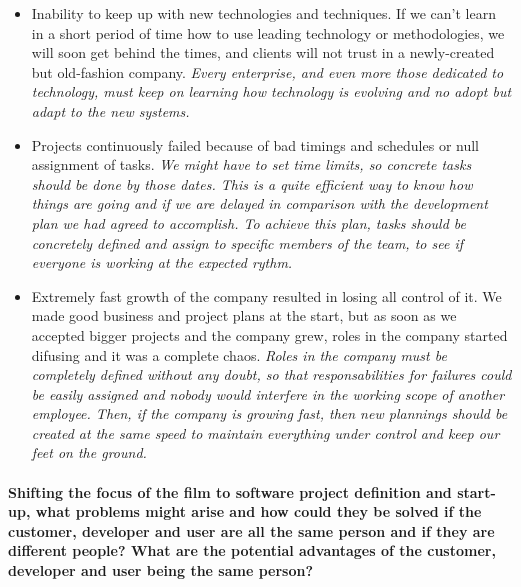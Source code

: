 \documentclass{article}
\begin{document}
\begin{itemize}
	\item Inability to keep up with new technologies and techniques. If we can't learn in a short period of time how to use leading technology or methodologies, we will soon get behind the times, and clients will not trust in a newly-created but old-fashion company. \textit{Every enterprise, and even more those dedicated to technology, must keep on learning how technology is evolving and no adopt but adapt to the new systems.}

	\item Projects continuously failed because of bad timings and schedules or null assignment of tasks. \textit{We might have to set time limits, so concrete tasks should be done by those dates. This is a quite efficient way to know how things are going and if we are delayed in comparison with the development plan we had agreed to accomplish. To achieve this plan, tasks should be concretely defined and assign to specific members of the team, to see if everyone is working at the expected rythm.}

	\item Extremely fast growth of the company resulted in losing all control of it. We made good business and project plans at the start, but as soon as we accepted bigger projects and the company grew, roles in the company started difusing and it was a complete chaos. \textit{Roles in the company must be completely defined without any doubt, so that responsabilities for failures could be easily assigned and nobody would interfere in the working scope of another employee. Then, if the company is growing fast, then new plannings should be created at the same speed to maintain everything under control and keep our feet on the ground.}
\end{itemize}



\paragraph{Shifting the focus of the film to software project definition and start-up, what problems might arise and how could they be solved if the customer, developer and user are all the same person and if they are different people? What are the potential advantages of the customer, developer and user being the same person?}
\paragraph{}
\end{document}
